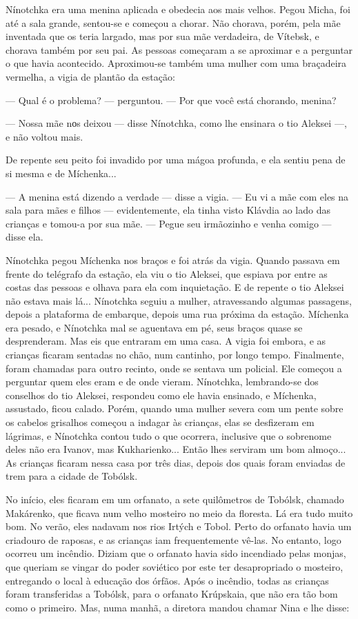 Nínotchka era uma menina aplicada e obedecia aos mais velhos. Pegou
Micha, foi até a sala grande, sentou-se e começou a chorar. Não chorava,
porém, pela mãe inventada que os teria largado, mas por sua mãe
verdadeira, de Vítebsk, e chorava também por seu pai. As pessoas
começaram a se aproximar e a perguntar o que havia acontecido.
Aproximou-se também uma mulher com uma braçadeira vermelha, a vigia de
plantão da estação:

--- Qual é o problema? --- perguntou. --- Por que você está chorando,
menina?

--- Nossa mãe nоs deixou --- disse Nínotchka, como lhe ensinara o tio
Aleksei ---, e não voltou mais.

De repente seu peito foi invadido por uma mágoa profunda, e ela sentiu
pena de si mesma e de Míchenka...

--- A menina está dizendo a verdade --- disse a vigia. --- Eu vi a mãe
com eles na sala para mães e filhos --- evidentemente, ela tinha visto
Klávdia ao lado das crianças e tomou-a por sua mãe. --- Pegue seu
irmãozinho e venha comigo --- disse ela.

Nínotchka pegou Míchenka nos braços e foi atrás da vigia. Quando passava
em frente do telégrafo da estação, ela viu o tio Aleksei, que espiava
por entre as costas das pessoas e olhava para ela com inquietação. E de
repente o tio Aleksei não estava mais lá... Nínotchka seguiu a mulher,
atravessando algumas passagens, depois a plataforma de embarque, depois
uma rua próxima da estação. Míchenka era pesado, e Nínotchka mal se
aguentava em pé, seus braços quase se desprenderam. Mas eis que entraram
em uma casa. A vigia foi embora, e as crianças ficaram sentadas no chão,
num cantinho, por longo tempo. Finalmente, foram chamadas para outro
recinto, onde se sentava um policial. Ele começou a perguntar quem eles
eram e de onde vieram. Nínotchka, lembrando-se dos conselhos do tio
Aleksei, respondeu como ele havia ensinado, e Míchenka, assustado, ficou
calado. Porém, quando uma mulher severa com um pente sobre os cabelos
grisalhos começou a indagar às crianças, elas se desfizeram em lágrimas,
e Nínotchka contou tudo o que ocorrera, inclusive que o sobrenome deles
não era Ivanov, mas Kukharienko... Então lhes serviram um bom almoço...
As crianças ficaram nessa casa por três dias, depois dos quais foram
enviadas de trem para a cidade de Tobólsk.

No início, eles ficaram em um orfanato, a sete quilômetros de Tobólsk,
chamado Makárenko, que ficava num velho mosteiro no meio da floresta. Lá
era tudo muito bom. No verão, eles nadavam nos rios Irtých e Tobol.
Perto do orfanato havia um criadouro de raposas, e as crianças iam
frequentemente vê-las. No entanto, logo ocorreu um incêndio. Diziam que
o orfanato havia sido incendiado pelas monjas, que queriam se vingar do
poder soviético por este ter desapropriado o mosteiro, entregando o
local à educação dos órfãos. Após o incêndio, todas as crianças foram
transferidas a Tobólsk, para o orfanato Krúpskaia, que não era tão bom
como o primeiro. Mas, numa manhã, a diretora mandou chamar Nina e lhe
disse:

